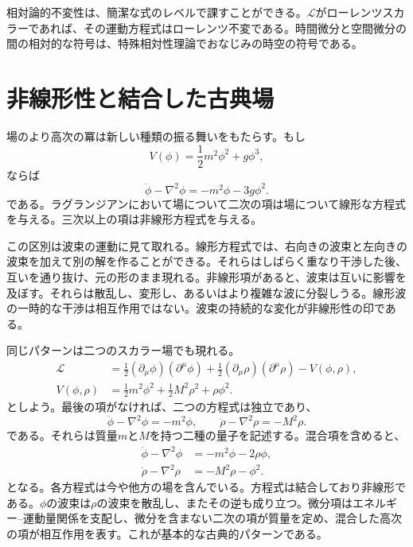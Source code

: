 相対論的不変性は、簡潔な式のレベルで課すことができる。\(\mathcal L\)がローレンツスカラーであれば、その運動方程式はローレンツ不変である。時間微分と空間微分の間の相対的な符号は、特殊相対性理論でおなじみの時空の符号である。

\section{非線形性と結合した古典場}

場のより高次の冪は新しい種類の振る舞いをもたらす。もし
\begin{equation}
V(\phi)=\frac12m^2\phi^2+g\phi^3,
\end{equation}
ならば
\begin{equation}
\ddot\phi-\nabla^2\phi=-m^2\phi-3g\phi^2.
\end{equation}
である。ラグランジアンにおいて場について二次の項は場について線形な方程式を与える。三次以上の項は非線形方程式を与える。

この区別は波束の運動に見て取れる。線形方程式では、右向きの波束と左向きの波束を加えて別の解を作ることができる。それらはしばらく重なり干渉した後、互いを通り抜け、元の形のまま現れる。非線形項があると、波束は互いに影響を及ぼす。それらは散乱し、変形し、あるいはより複雑な波に分裂しうる。線形波の一時的な干渉は相互作用ではない。波束の持続的な変化が非線形性の印である。

同じパターンは二つのスカラー場でも現れる。
\begin{align}
\mathcal L
&=
\frac12(\partial_\mu\phi)(\partial^\mu\phi)
+\frac12(\partial_\mu\rho)(\partial^\mu\rho)
-V(\phi,\rho),
\\
V(\phi,\rho)
&=
\frac12m^2\phi^2+\frac12M^2\rho^2+\rho\phi^2.
\end{align}
としよう。最後の項がなければ、二つの方程式は独立であり、
\begin{equation}
\ddot\phi-\nabla^2\phi=-m^2\phi,
\qquad
\ddot\rho-\nabla^2\rho=-M^2\rho.
\end{equation}
である。それらは質量\(m\)と\(M\)を持つ二種の量子を記述する。混合項を含めると、
\begin{align}
\ddot\phi-\nabla^2\phi&=-m^2\phi-2\rho\phi,
\\
\ddot\rho-\nabla^2\rho&=-M^2\rho-\phi^2.
\end{align}
となる。各方程式は今や他方の場を含んでいる。方程式は結合しており非線形である。\(\phi\)の波束は\(\rho\)の波束を散乱し、またその逆も成り立つ。微分項はエネルギー--運動量関係を支配し、微分を含まない二次の項が質量を定め、混合した高次の項が相互作用を表す。これが基本的な古典的パターンである。

